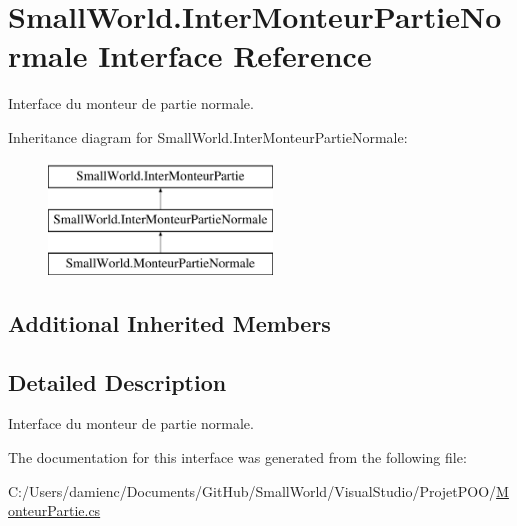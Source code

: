 \hypertarget{interface_small_world_1_1_inter_monteur_partie_normale}{\section{Small\-World.\-Inter\-Monteur\-Partie\-Normale Interface Reference}
\label{interface_small_world_1_1_inter_monteur_partie_normale}
}


Interface du monteur de partie normale.  


Inheritance diagram for Small\-World.\-Inter\-Monteur\-Partie\-Normale\-:\begin{figure}[H]
\begin{center}
\leavevmode
\includegraphics[height=3.000000cm]{interface_small_world_1_1_inter_monteur_partie_normale}
\end{center}
\end{figure}
\subsection*{Additional Inherited Members}


\subsection{Detailed Description}
Interface du monteur de partie normale. 

The documentation for this interface was generated from the following file\-:\begin{DoxyCompactItemize}
\item 
C\-:/\-Users/damienc/\-Documents/\-Git\-Hub/\-Small\-World/\-Visual\-Studio/\-Projet\-P\-O\-O/\hyperlink{_monteur_partie_8cs}{Monteur\-Partie.\-cs}\end{DoxyCompactItemize}
